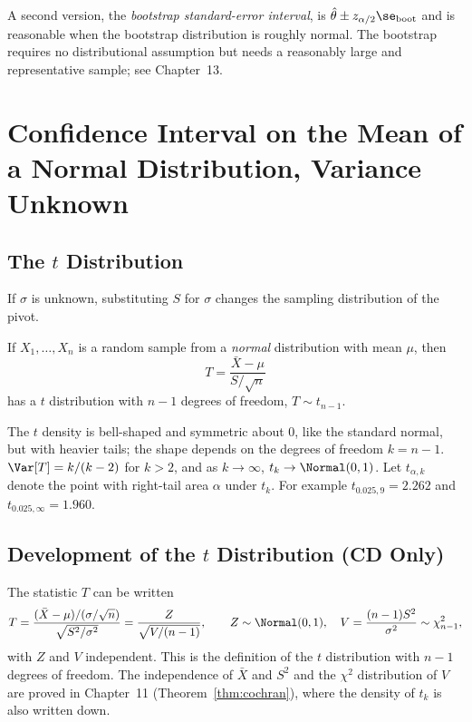 A second version, the \emph{bootstrap standard-error interval}, is $\hat\theta\pm z_{\alpha/2}\se_{\mathrm{boot}}$ and is reasonable when the bootstrap distribution is roughly normal. The bootstrap requires no distributional assumption but needs a reasonably large and representative sample; see Chapter~13.

\section{Confidence Interval on the Mean of a Normal Distribution, Variance Unknown}

\subsection{The $t$ Distribution}

If $\sigma$ is unknown, substituting $S$ for $\sigma$ changes the sampling distribution of the pivot.

\begin{theorem}\label{thm:t-pivot}
If $X_1,\dots,X_n$ is a random sample from a \emph{normal} distribution with mean $\mu$, then
\[ T=\frac{\bar{X}-\mu}{S/\sqrt n} \]
has a $t$ distribution with $n-1$ degrees of freedom, $T\sim t_{n-1}$.
\end{theorem}

The $t$ density is bell-shaped and symmetric about $0$, like the standard normal, but with heavier tails; the shape depends on the degrees of freedom $k=n-1$. $\Var[T]=k/(k-2)$ for $k>2$, and as $k\to\infty$, $t_k\to\Normal(0,1)$. Let $t_{\alpha,k}$ denote the point with right-tail area $\alpha$ under $t_k$. For example $t_{0.025,9}=2.262$ and $t_{0.025,\infty}=1.960$.

\subsection{Development of the $t$ Distribution (CD Only)}

The statistic $T$ can be written
\[ T=\frac{(\bar{X}-\mu)/(\sigma/\sqrt n)}{\sqrt{S^2/\sigma^2}}=\frac{Z}{\sqrt{V/(n-1)}},\qquad Z\sim\Normal(0,1),\quad V=\frac{(n-1)S^2}{\sigma^2}\sim\chi^2_{n-1}, \]
with $Z$ and $V$ independent. This is the definition of the $t$ distribution with $n-1$ degrees of freedom. The independence of $\bar{X}$ and $S^2$ and the $\chi^2$ distribution of $V$ are proved in Chapter~11 (Theorem~\ref{thm:cochran}), where the density of $t_k$ is also written down.

